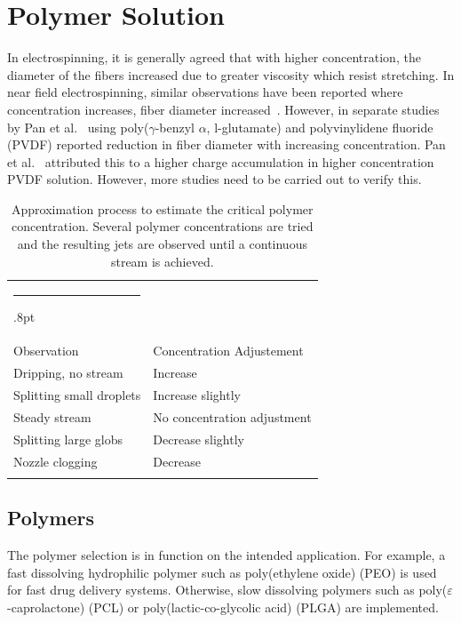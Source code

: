 \documentclass[5p,,preprint,12pt,twocolumn]{elsarticle}
\makeatletter
\def\hlinewd#1{%
  \noalign{\ifnum0=`}\fi\hrule \@height #1%
  \futurelet\reserved@a\@xhline}
\def\tbltoprule{\hlinewd{.8pt}\\[-12pt]}
\def\tblbottomrule{\noalign{\vspace*{6pt}}\hline\noalign{\vspace*{2pt}}}
\def\tblmidrule{\noalign{\vspace*{6pt}}\hline\noalign{\vspace*{2pt}}}
\makeatother
\begin{document}
\section{Polymer Solution}
In electrospinning, it is generally agreed that with higher concentration, the diameter of the fibers increased due to greater viscosity which resist stretching. In near field electrospinning, similar observations have been reported where concentration increases, fiber diameter increased\unskip~\cite{527120:11974306,527120:11974329}. However, in separate studies by Pan et al.\unskip~\cite{527120:11974317,527120:12321129} using poly(\ensuremath{\gamma }-benzyl \ensuremath{\alpha }, l-glutamate) and polyvinylidene fluoride (PVDF) reported reduction in fiber diameter with increasing concentration. Pan et al.\unskip~\cite{527120:12321129} attributed this to a higher charge accumulation in higher concentration PVDF solution. However, more studies need to be carried out to verify this.
\begin{table}[!htbp]
\caption{{Approximation process to estimate the critical polymer concentration. Several polymer concentrations are tried and the resulting jets are observed until a continuous stream is achieved.} }
\label{tw-8687dd17082c}
\def\arraystretch{1}
\ignorespaces 
\centering 
\begin{tabulary}{\linewidth}{LL}
\tbltoprule Observation & Concentration Adjustement\\
\tblmidrule 
Dripping, no stream &
  Increase\\
Splitting small droplets &
  Increase slightly\\
Steady stream &
  No concentration adjustment\\
Splitting large globs &
  Decrease slightly\\
Nozzle clogging  &
  Decrease\\
\tblbottomrule 
\end{tabulary}\par 
\end{table}




\subsection{Polymers}The polymer selection is in function on the intended application. For example, a fast dissolving hydrophilic polymer such as poly(ethylene oxide) (PEO) is used for fast drug delivery systems. Otherwise, slow dissolving polymers such as poly($\varepsilon $-caprolactone) (PCL) or poly(lactic-co-glycolic acid) (PLGA) are implemented. \unskip~\cite{527120:13082763}
\end{document}
